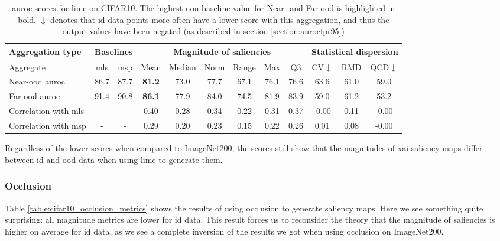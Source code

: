 \documentclass[UKenglish]{uiomasterthesis} %
\theoremstyle{definition}
\begin{document}
\begin{table}[hbtp]
\setlength\tabcolsep{3pt}
\begin{center}
\begin{tabular}{ |p{5.1em}|c c|c c c c c c|c c c| }
    \hline
     \centering Aggregation type & \multicolumn{2}{c|}{Baselines} & \multicolumn{6}{c|}{Magnitude of saliencies} & \multicolumn{3}{p{8em}|}{\centering Statistical dispersion} \\
    \hline
    Aggregate & \ac{mls} & \ac{msp} & Mean & Median & Norm & Range & Max & Q3 & CV$\downarrow$ & RMD & QCD$\downarrow$  \\
    \hline
    \rowcolor{near!50}
    Near-\ac{ood} \ac{auroc} & 86.7 & 87.7 &\textbf{ 81.2 }& 73.0 & 77.7 & 67.1 & 76.1 & 76.6 & 63.6 & 61.0 & 59.0  \\
    \hline
    \rowcolor{far!50}
    Far-\ac{ood} \ac{auroc} & 91.4 & 90.8 &\textbf{ 86.1 }& 77.9 & 84.0 & 74.5 & 81.9 & 83.9 & 59.0 & 61.2 & 53.2  \\
    \hline
    Correlation with \ac{mls}& - & - & 0.40 & 0.28 & 0.34 & 0.22 & 0.31 & 0.37 & -0.00 & 0.11 & -0.00  \\
    \hline
    Correlation with \ac{msp}& - & - & 0.29 & 0.20 & 0.23 & 0.15 & 0.22 & 0.26 & 0.01 & 0.08 & -0.00  \\
    \hline
    \end{tabular}
    \caption[\ac{auroc} scores for \ac{lime} on CIFAR10]{\ac{auroc} scores for \ac{lime} on CIFAR10. The highest non-baseline value for Near- and Far-\ac{ood} is highlighted in bold. $\downarrow$ denotes that \ac{id} data points more often have a lower score with this aggregation, and thus the output values have been negated (as described in section \ref{section:aurocfpr95})}
    \label{table:cifar10_lime_metrics}
\end{center}

\setlength\tabcolsep{6pt}
\end{table}

Regardless of the lower scores when compared to ImageNet200, the scores still show that the magnitudes of \ac{xai} saliency maps differ between \ac{id} and \ac{ood} data when using \ac{lime} to generate them.

\subsubsection{Occlusion}

Table \ref{table:cifar10_occlusion_metrics} shows the results of using occlusion to generate saliency maps. Here we see something quite surprising: all magnitude metrics are lower for \ac{id} data. This result forces us to reconsider the theory that the magnitude of saliencies is higher on average for \ac{id} data, as we see a complete inversion of the results we got when using occlusion on ImageNet200. %
\end{document}
